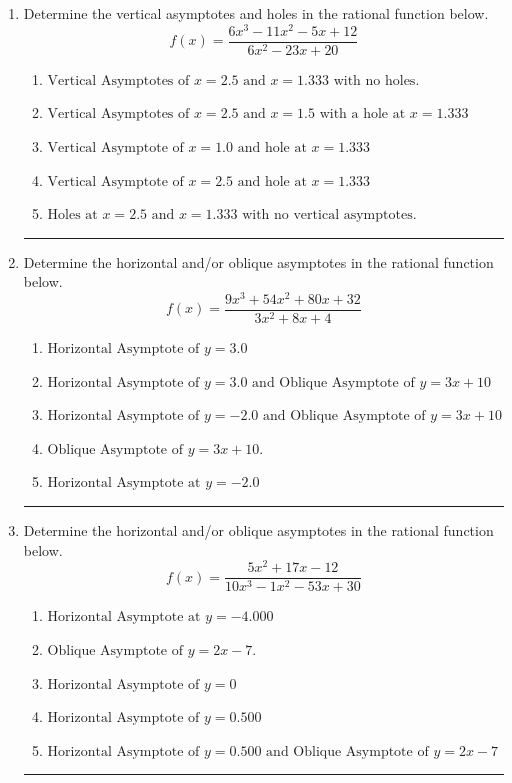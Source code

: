 \documentclass[14pt]{extbook}
\newcommand{\litem}[1]{\item#1\hspace*{-1cm}\rule{\textwidth}{0.4pt}}
\begin{document}
\begin{enumerate}
{\begin{enumerate}[label=\Alph*.]
\end{enumerate} }
\litem{
Determine the vertical asymptotes and holes in the rational function below.\[ f(x) = \frac{6x^{3} -11 x^{2} -5 x + 12}{6x^{2} -23 x + 20} \]\begin{enumerate}[label=\Alph*.]
\item \( \text{Vertical Asymptotes of } x = 2.5 \text{ and } x = 1.333 \text{ with no holes.} \)
\item \( \text{Vertical Asymptotes of } x = 2.5 \text{ and } x = 1.5 \text{ with a hole at } x = 1.333 \)
\item \( \text{Vertical Asymptote of } x = 1.0 \text{ and hole at } x = 1.333 \)
\item \( \text{Vertical Asymptote of } x = 2.5 \text{ and hole at } x = 1.333 \)
\item \( \text{Holes at } x = 2.5 \text{ and } x = 1.333 \text{ with no vertical asymptotes.} \)

\end{enumerate} }
\litem{
Determine the horizontal and/or oblique asymptotes in the rational function below.\[ f(x) = \frac{9x^{3} +54 x^{2} +80 x + 32}{3x^{2} +8 x + 4} \]\begin{enumerate}[label=\Alph*.]
\item \( \text{Horizontal Asymptote of } y = 3.0  \)
\item \( \text{Horizontal Asymptote of } y = 3.0 \text{ and Oblique Asymptote of } y = 3x + 10 \)
\item \( \text{Horizontal Asymptote of } y = -2.0 \text{ and Oblique Asymptote of } y = 3x + 10 \)
\item \( \text{Oblique Asymptote of } y = 3x + 10. \)
\item \( \text{Horizontal Asymptote at } y = -2.0 \)

\end{enumerate} }
\litem{
Determine the horizontal and/or oblique asymptotes in the rational function below.\[ f(x) = \frac{5x^{2} +17 x -12}{10x^{3} -1 x^{2} -53 x + 30} \]\begin{enumerate}[label=\Alph*.]
\item \( \text{Horizontal Asymptote at } y = -4.000 \)
\item \( \text{Oblique Asymptote of } y = 2x -7. \)
\item \( \text{Horizontal Asymptote of } y = 0 \)
\item \( \text{Horizontal Asymptote of } y = 0.500  \)
\item \( \text{Horizontal Asymptote of } y = 0.500 \text{ and Oblique Asymptote of } y = 2x -7 \)


\end{enumerate}}
\end{enumerate}
\end{document}
